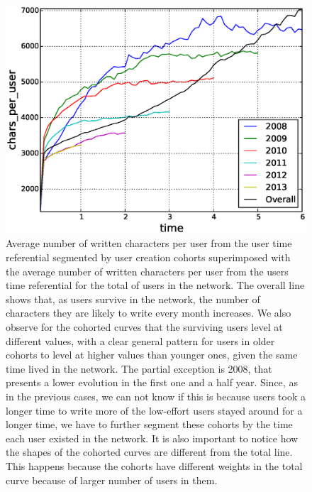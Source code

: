 
\begin{figure}[!tb]
\centering
\includegraphics[scale=0.4]{./images/avr_comment_size_user_cohorts.eps}
\caption{Average number of written characters per user from the user time referential segmented by user creation cohorts superimposed with the average number of written characters per user from the users time referential for the total of users in the network. The overall line shows that, as users survive in the network, the number of characters they are likely to write every month increases. We also observe for the cohorted curves that the surviving users level at different values, with a clear general pattern for users in older cohorts to level at higher values than younger ones, given the same time lived in the network. The partial exception is 2008, that presents a lower evolution in the first one and a half year. Since, as in the previous cases, we can not know if this is because users took a longer time to write more of the low-effort users stayed around for a longer time, we have to further segment these cohorts by the time each user existed in the network. It is also important to notice how the shapes of the cohorted curves are different from the total line. This happens because the cohorts have different weights in the total curve because of larger number of users in them.}
\label{fig:avr_comment_size_user_cohorts}
\end{figure}

